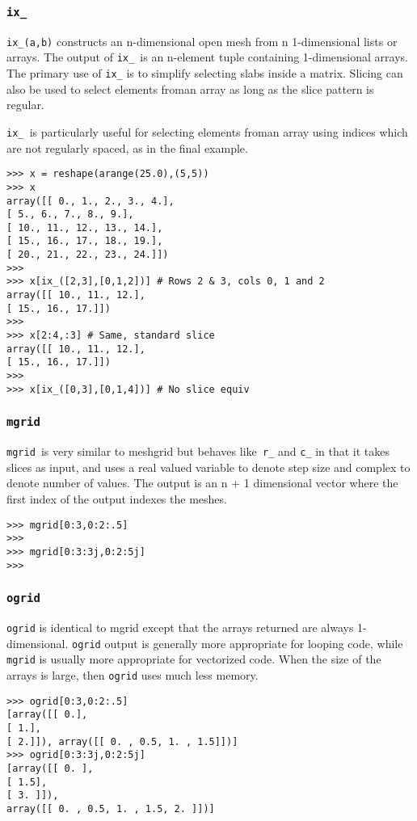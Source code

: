 \documentclass[KSmain.tex]{subfiles}
\begin{document}
\subsubsection{\texttt{ix\_}}
\texttt{ix\_(a,b)} constructs an n-dimensional open mesh from n 1-dimensional lists or arrays. The output of
\texttt{ix\_ }is an n-element tuple containing 1-dimensional arrays. The primary use of \texttt{ix\_} is to simplify selecting
slabs inside a matrix. Slicing can also be used to select elements froman array as long as the slice pattern is
regular. 

\noindent \texttt{ix\_ }is particularly useful for selecting elements froman array using indices which are not regularly
spaced, as in the final example.
\begin{framed}
\begin{verbatim}
>>> x = reshape(arange(25.0),(5,5))
>>> x
array([[ 0., 1., 2., 3., 4.],
[ 5., 6., 7., 8., 9.],
[ 10., 11., 12., 13., 14.],
[ 15., 16., 17., 18., 19.],
[ 20., 21., 22., 23., 24.]])
>>>
>>> x[ix_([2,3],[0,1,2])] # Rows 2 & 3, cols 0, 1 and 2
array([[ 10., 11., 12.],
[ 15., 16., 17.]])
>>>
>>> x[2:4,:3] # Same, standard slice
array([[ 10., 11., 12.],
[ 15., 16., 17.]])
>>>
>>> x[ix_([0,3],[0,1,4])] # No slice equiv
\end{verbatim}
\end{framed}
\newpage
\subsubsection{\texttt{mgrid}}
\texttt{mgrid }is very similar to meshgrid but behaves like\texttt{ r\_} and \texttt{c\_} in that it takes slices as input, and uses a
real valued variable to denote step size and complex to denote number of values. The output is an n + 1
dimensional vector where the first index of the output indexes the meshes.
\begin{framed}
\begin{verbatim}
>>> mgrid[0:3,0:2:.5]
>>>
>>> mgrid[0:3:3j,0:2:5j]
>>>
\end{verbatim}
\end{framed}

\subsubsection{\texttt{ogrid}}
\texttt{ogrid} is identical to mgrid except that the arrays returned are always 1-dimensional. \texttt{ogrid} output is generally
more appropriate for looping code, while \texttt{mgrid} is usually more appropriate for vectorized code.
When the size of the arrays is large, then \texttt{ogrid} uses much less memory.
\begin{framed}
\begin{verbatim}
>>> ogrid[0:3,0:2:.5]
[array([[ 0.],
[ 1.],
[ 2.]]), array([[ 0. , 0.5, 1. , 1.5]])]
>>> ogrid[0:3:3j,0:2:5j]
[array([[ 0. ],
[ 1.5],
[ 3. ]]),
array([[ 0. , 0.5, 1. , 1.5, 2. ]])]
\end{verbatim}
\end{framed}
\end{document}
